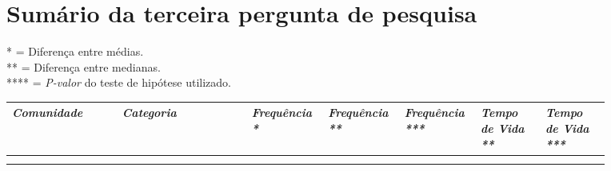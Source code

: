 \chapter{Sumário da terceira pergunta de pesquisa}
\label{app:q3}

\small

* = Diferença entre médias. \\
** = Diferença entre medianas. \\
**** = \textit{P-valor} do teste de hipótese utilizado. 
\begin{longtabu}{@{}
	p{0.17\linewidth}
	p{0.2\linewidth}
	P{0.1\linewidth}
	P{0.1\linewidth}
	P{0.1\linewidth}
	P{0.1\linewidth}
	p{0.1\linewidth}@{}}

\toprule
\textit{Comunidade}  & \textit{Categoria}  & \textit{Frequência *} & \textit{Frequência **} & \textit{Frequência ***} & \textit{Tempo de Vida **} & \textit{Tempo de Vida ***} \\ \midrule
\endhead

\\ \hline
\endfoot


\end{longtabu}
